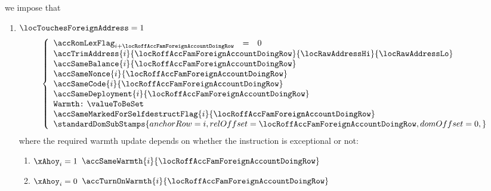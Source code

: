 \begin{description}
		we impose that
		\begin{enumerate}
			\item \If $\locTouchesForeignAddress = 1$ \Then
				\[
					\left\{ \begin{array}{lcl}
						\accRomLexFlag   _{i + \locRoffAccFamForeignAccountDoingRow} & = & 0 \\
						\multicolumn{3}{l}{\accTrimAddress
						{i}{\locRoffAccFamForeignAccountDoingRow}
						{\locRawAddressHi}
						{\locRawAddressLo}} \\
						\multicolumn{3}{l}{\accSameBalance                    {i}{\locRoffAccFamForeignAccountDoingRow}}   \\
						\multicolumn{3}{l}{\accSameNonce                      {i}{\locRoffAccFamForeignAccountDoingRow}}   \\
						\multicolumn{3}{l}{\accSameCode                       {i}{\locRoffAccFamForeignAccountDoingRow}}   \\
						\multicolumn{3}{l}{\accSameDeployment                 {i}{\locRoffAccFamForeignAccountDoingRow}}   \\
						\multicolumn{3}{l}{\texttt{Warmth:} ~ \valueToBeSet}                                               \\
						\multicolumn{3}{l}{\accSameMarkedForSelfdestructFlag  {i}{\locRoffAccFamForeignAccountDoingRow}}   \\
						\multicolumn{3}{l}{
							\standardDomSubStamps {
								anchorRow        = i                                    ,
								relOffset        = \locRoffAccFamForeignAccountDoingRow ,
								domOffset        = 0                                    ,
							}} \\
					\end{array} \right.
				\]
				where the required warmth update depends on whether the instruction is exceptional or not:
				\begin{enumerate}
					\item \If $\xAhoy _{i} = 1$ \Then $\accSameWarmth   {i}{\locRoffAccFamForeignAccountDoingRow}$
					\item \If $\xAhoy _{i} = 0$ \Then $\accTurnOnWarmth {i}{\locRoffAccFamForeignAccountDoingRow}$

\end{enumerate}
\end{enumerate}
\end{description}
